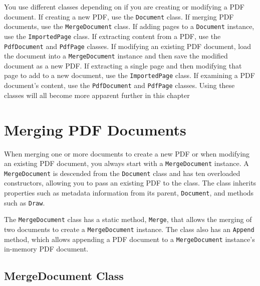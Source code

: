 \documentclass[american,letterpaper]{tufte-book}
\numberwithin{equation}{section}
\numberwithin{figure}{section}
\begin{document}
{{You use different classes depending on if you are creating or modifying
a PDF document. If creating a new PDF, use the \texttt{Document} class.
If merging PDF documents, use the \texttt{MergeDocument} class. If
adding pages to a \texttt{Document} instance, use the \texttt{ImportedPage}
class. If extracting content from a PDF, use the \texttt{PdfDocument}
and \texttt{PdfPage} classes. If modifying an existing PDF document,
load the document into a \texttt{MergeDocument} instance and then
save the modified document as a new PDF.
If extracting a single page and then modifying that page to add to
a new document, use the \texttt{ImportedPage} class. If examining
a PDF document's content, use the \texttt{PdfDocument} and \texttt{PdfPage}
classes. Using these classes will all become more apparent further
in this chapter
\section{Merging PDF Documents}

When merging one or more documents to create a new PDF or when modifying
an existing PDF document, you always start with a \texttt{MergeDocument}
instance. A \texttt{MergeDocument} is descended from the \texttt{Document}
class and has ten overloaded constructors, allowing you to pass an
existing PDF to the class. The class inherits properties such as metadata
information from its parent, \texttt{Document}, and methods such as
\texttt{Draw}.

The \texttt{MergeDocument} class has a static method, \texttt{Merge},
that allows the merging of two documents to create a \texttt{MergeDocument}
instance. The class also has an \texttt{Append} method, which allows
appending a PDF document to a \texttt{MergeDocument} instance's in-memory
PDF document. 

\subsection{MergeDocument Class}

}}
\end{document}
